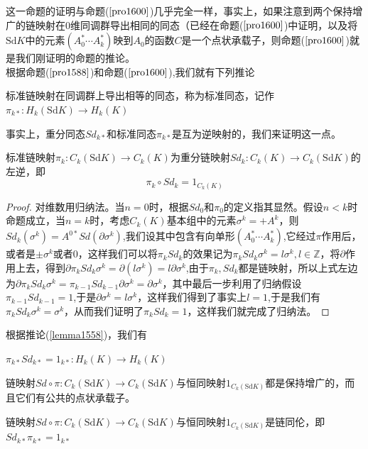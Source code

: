 这一命题的证明与命题($\ref{pro1600}$)几乎完全一样，事实上，如果注意到两个保持增广的链映射在$0$维同调群导出相同的同态（已经在命题($\ref{pro1600}$)中证明，以及将$\text{Sd}K$中的元素$(A_{0}^{*}\cdots A_{k}^{*})$映到$A_{0}$的函数$C$是一个点状承载子，则命题($\ref{pro1600}$)就是我们刚证明的命题的推论。\\
根据命题($\ref{pro1588}$)和命题($\ref{pro1600}$),我们就有下列推论
\begin{corollary}
标准链映射在同调群上导出相等的同态，称为标准同态，记作$\pi_{k*}:H_{k}(\text{Sd}K)\rightarrow H_{k}(K)$
\end{corollary}
事实上，重分同态$Sd_{k*}$和标准同态$\pi_{k*}$是互为逆映射的，我们来证明这一点。
\begin{lemma}
标准链映射$\pi_{k}:C_{k}(\text{Sd}K)\rightarrow C_{k}(K)$为重分链映射$Sd_{k}:C_{k}(K)\rightarrow C_{k}(\text{Sd}K)$的左逆，即
\begin{equation*}
    \pi_{k}\circ Sd_{k}=1_{C_{k}(K)}
\end{equation*}
\end{lemma}
\begin{proof}
对维数用归纳法。当$n=0$时，根据$Sd_{0}$和$\pi_{0}$的定义指其显然。假设$n<k$时命题成立，当$n=k$时，考虑$C_{k}(K)$基本组中的元素$\sigma^{k}=+A^{k}$，则$Sd_{k}(\sigma^{k})=A^{0*}Sd(\partial \sigma^{k})$,我们设其中包含有向单形$(A_{0}^{*}\cdots A_{k}^{*})$,它经过$\pi$作用后，或者是$\pm \sigma^{k}$或者0，这样我们可以将$\pi_{k}Sd_{k}$的效果记为$\pi_{k}Sd_{k}\sigma^{k}=l\sigma^{k},l\in\mathbb{Z}$，将$\partial$作用上去，得到$\partial \pi_{k}Sd_{k}\sigma^{k}=\partial(l\sigma^{k})=l\partial\sigma^{k}$,由于$\pi_{k},Sd_{k}$都是链映射，所以上式左边为$\partial \pi_{k}Sd_{k}\sigma^{k}=\pi_{k-1}Sd_{k-1}\partial\sigma^{k}=\partial\sigma^{k}$，其中最后一步利用了归纳假设$\pi_{k-1}Sd_{k-1}=1$,于是$\partial\sigma^{k}=l\sigma^{k}$，这样我们得到了事实上$l=1$,于是我们有$\pi_{k}Sd_{k}\sigma^{k}=\sigma^{k}$，从而我们证明了$\pi_{k}Sd_{k}=1$，这样我们就完成了归纳法。
\end{proof}
根据推论(\ref{lemma1558})，我们有
\begin{corollary}\label{cor1660}
$\pi_{k*}Sd_{k*}=1_{k*}:H_{k}(K)\rightarrow H_{k}(K)$
\end{corollary}
\begin{lemma}
链映射$Sd\circ \pi:C_{k}(\text{Sd}K)\rightarrow C_{k}(\text{Sd}K)$与恒同映射$1_{C_{k}(\text{Sd}K)}$都是保持增广的，而且它们有公共的点状承载子。
\end{lemma}
\begin{corollary}\label{cor1666}
链映射$Sd\circ \pi:C_{k}(\text{Sd}K)\rightarrow C_{k}(\text{Sd}K)$与恒同映射$1_{C_{k}(\text{Sd}K)}$是链同伦，即$Sd_{k*} \pi_{k*}=1_{k*}$
\end{corollary}
